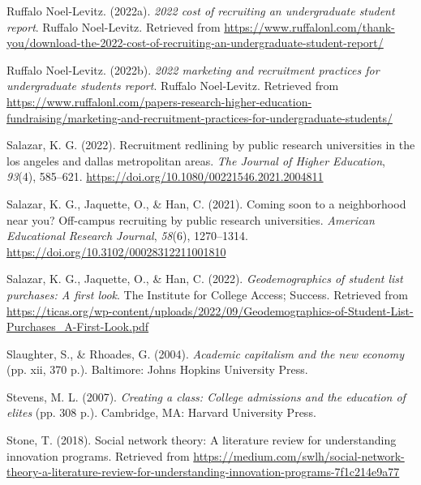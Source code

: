 \documentclass[
  12pt,
]{article}
\newlength{\cslhangindent}
\newlength{\cslentryspacingunit} %
\newenvironment{CSLReferences}[2] %
 {%
  \setlength{\parindent}{0pt}
  \ifodd #1
  \let\oldpar\par
  \def\par{\hangindent=\cslhangindent\oldpar}
  \fi
  \setlength{\parskip}{#2\cslentryspacingunit}
 }%
 {}
\begin{document}
\begin{CSLReferences}{1}{0}
\leavevmode{}%
Ruffalo Noel-Levitz. (2022a). \emph{2022 cost of recruiting an undergraduate student report}. Ruffalo Noel-Levitz. Retrieved from \url{https://www.ruffalonl.com/thank-you/download-the-2022-cost-of-recruiting-an-undergraduate-student-report/}

\leavevmode{}%
Ruffalo Noel-Levitz. (2022b). \emph{2022 marketing and recruitment practices for undergraduate students report}. Ruffalo Noel-Levitz. Retrieved from \url{https://www.ruffalonl.com/papers-research-higher-education-fundraising/marketing-and-recruitment-practices-for-undergraduate-students/}

\leavevmode{}%
Salazar, K. G. (2022). Recruitment redlining by public research universities in the los angeles and dallas metropolitan areas. \emph{The Journal of Higher Education}, \emph{93}(4), 585--621. \url{https://doi.org/10.1080/00221546.2021.2004811}

\leavevmode{}%
Salazar, K. G., Jaquette, O., \& Han, C. (2021). Coming soon to a neighborhood near you? Off-campus recruiting by public research universities. \emph{American Educational Research Journal}, \emph{58}(6), 1270--1314. \url{https://doi.org/10.3102/00028312211001810}

\leavevmode{}%
Salazar, K. G., Jaquette, O., \& Han, C. (2022). \emph{Geodemographics of student list purchases: A first look}. The Institute for College Access; Success. Retrieved from \url{https://ticas.org/wp-content/uploads/2022/09/Geodemographics-of-Student-List-Purchases_A-First-Look.pdf}

\leavevmode{}%
Slaughter, S., \& Rhoades, G. (2004). \emph{Academic capitalism and the new economy} (pp. xii, 370 p.). Baltimore: Johns Hopkins University Press.

\leavevmode{}%
Stevens, M. L. (2007). \emph{Creating a class: College admissions and the education of elites} (pp. 308 p.). Cambridge, MA: Harvard University Press.

\leavevmode{}%
Stone, T. (2018). Social network theory: A literature review for understanding innovation programs. Retrieved from \url{https://medium.com/swlh/social-network-theory-a-literature-review-for-understanding-innovation-programs-7f1c214e9a77}


\end{CSLReferences}
\end{document}
